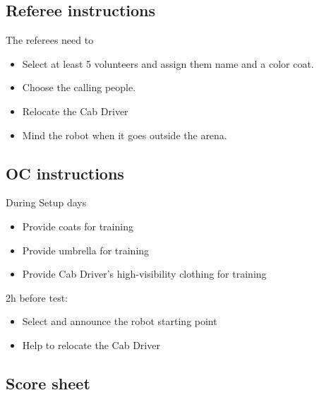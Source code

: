 \subsection*{Referee instructions}

The referees need to
\begin{itemize}
	\item Select at least 5 volunteers and assign them name and a color coat.
	\item Choose the calling people.
	\item Relocate the Cab Driver
	\item Mind the robot when it goes outside the arena.
\end{itemize}

\subsection*{OC instructions}
During Setup days
\begin{itemize}
	\item Provide coats for training
	\item Provide umbrella for training
	\item Provide Cab Driver's high-visibility clothing for training
\end{itemize}

2h before test:
\begin{itemize}
	\item Select and announce the robot starting point
	\item Help to relocate the Cab Driver
\end{itemize}

\subsection*{Score sheet}

